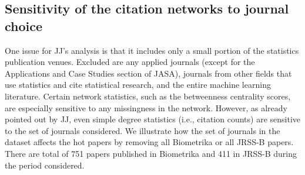 \documentclass[12pt]{article}
\begin{document}
\subsection*{Sensitivity of the citation networks to journal choice}

One issue for JJ's analysis is that it includes only a small
portion of the statistics publication venues.  Excluded are any applied
journals (except for the Applications and Case Studies section of JASA),
journals from other fields that use statistics and cite statistical research,
and the entire machine learning literature.  Certain network statistics, such
as the betweenness centrality scores, are especially sensitive to any
missingness in the network.  However, as already pointed out by JJ, even simple
 degree statistics (i.e., citation counts) are sensitive to the set of
journals considered. We illustrate how the set of journals in the dataset affects
the hot papers by removing all Biometrika or all JRSS-B papers. There are
total of 751 papers published in Biometrika and 411 in JRSS-B during the
period considered.



\begin{table}[htb]
\centering
\caption{``Hot" papers (alphabetically) identified  by degree centrality (Column 2; for citation networks of papers), closeness centrality, and betweenness centrality, when papers
  published in Biometrika are removed.   Numbers in column $2$-$4$ are the ranks (shown when the rank is   smaller than or equal to $5$).}
\end{table}
\end{document}
